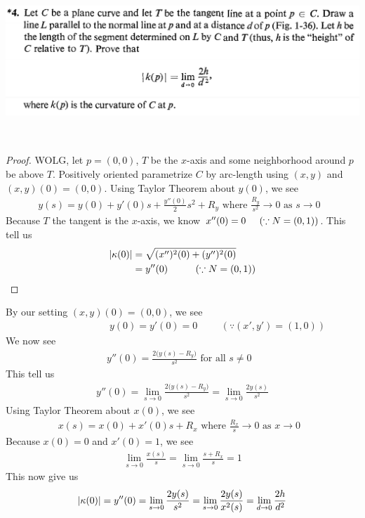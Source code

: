 \documentclass{report}
\begin{document}
\begin{question}{}{}
\includegraphics[height=6cm,width=18cm]{hw2q14}
\end{question}
\begin{proof}
WOLG, let $p=(0,0)$, $T$ be the $x$-axis and some neighborhood around $p$ be above  $T$. Positively oriented  parametrize $C$ by arc-length using  $(x,y)$ and $(x,y)(0)=(0,0)$. Using Taylor Theorem about $y(0)$, we see 
\begin{align*}
y(s)=y(0)+y'(0)s + \frac{y''(0)}{2}s^2 + R_y\text{ where $\frac{R_y}{s^2}\to 0$ as $s\to 0$ }
\end{align*}
 Because $T$ the tangent is the $x$-axis, we know $x''(0)=0\hspace{0.5cm}(\because N=(0,1))$. This tell us 
 \begin{align*}
\left|\kappa(0)\right|&=\sqrt{(x'')^2(0)+(y'')^2(0)} \\
 &=y''(0)\hspace{1cm}(\because N=(0,1) )
 \end{align*}
\end{proof} 
By our setting $(x,y)(0)=(0,0)$, we see 
\begin{align*}
\hspace{3cm}y(0)=y'(0)=0\hspace{1cm}(\because (x',y')=(1,0))
\end{align*}
We now see 
\begin{align*}
y''(0)= \frac{2\big(y(s)-R_y \big)}{s^2}\text{ for all $s\neq 0$ }
\end{align*}
This tell us 
\begin{align*}
y''(0)=\lim_{s\to 0}\frac{2\big(y(s)-R_y \big)}{s^2}=\lim_{s\to 0}\frac{2y(s)}{s^2}
\end{align*}
Using Taylor Theorem about $x(0)$, we see 
\begin{align*}
x(s)=x(0)+x'(0)s + R_x\text{ where }\frac{R_x}{s}\to 0\text{ as $x \to 0$ }
\end{align*}
Because $x(0)=0$ and $x'(0)=1$, we see 
\begin{align*}
\lim_{s\to 0}\frac{x(s)}{s}=\lim_{s\to 0} \frac{s+R_x}{s}=1
\end{align*}
This now give us 
\begin{align*}
\left|\kappa (0)\right|=y''(0)=\lim_{s\to 0}\frac{2y(s)}{s^2}=\lim_{s\to 0}\frac{2y(s)}{x^2(s)}=\lim_{d\to 0}\frac{2h}{d^2}
\end{align*}
\end{document}
